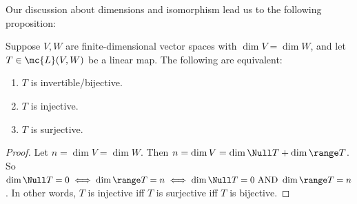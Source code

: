 \documentclass[math0540-lecture-notes.tex]{subfiles}
\begin{document}
Our discussion about dimensions and isomorphism lead us to the following proposition:
\begin{proposition}[]{}
  Suppose $V,W$ are finite-dimensional vector spaces with $ \dim V = \dim W$, and let $T\in
  \mc{L}(V,W)$ be a linear map. The following are equivalent:
  \begin{enumerate}
    \item $T$ is invertible/bijective.
    \item $T$ is injective.
    \item $T$ is surjective.
  \end{enumerate}
\end{proposition}

\begin{proof}[Proof]
  Let $n=\dim V = \dim W$. Then $n=\dim V=\dim\Null T + \dim\range T$. So $\dim\Null T=0 \iff
  \dim\range T=n\iff \dim\Null T=0 ~\text{AND}~\dim\range T=n$. In other words, $T$ is injective iff
  $T$ is surjective iff $T$ is bijective.
\end{proof}
\end{document}
